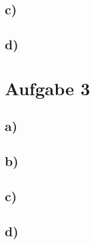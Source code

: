 \subsection{c)}

\subsection{d)}


\section{Aufgabe 3}

\subsection{a)}

\subsection{b)}

\subsection{c)}

\subsection{d)}


